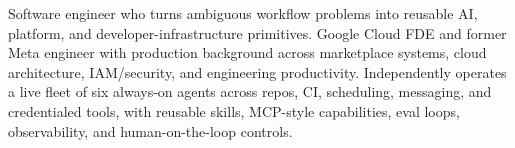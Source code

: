 


Software engineer who turns ambiguous workflow problems into reusable AI, platform, and developer-infrastructure primitives. Google Cloud FDE and former Meta engineer with production background across marketplace systems, cloud architecture, IAM/security, and engineering productivity. Independently operates a live fleet of six always-on agents across repos, CI, scheduling, messaging, and credentialed tools, with reusable skills, MCP-style capabilities, eval loops, observability, and human-on-the-loop controls.







